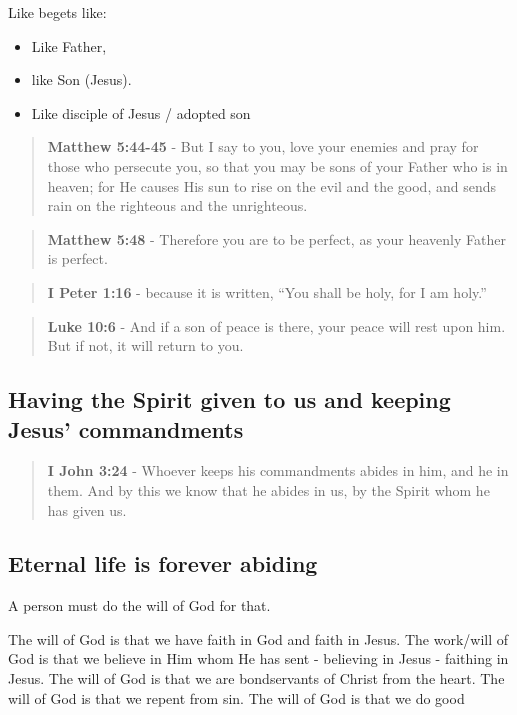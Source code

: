 \documentclass[11pt]{article}
\begin{document}
Like begets like:
\begin{itemize}
\item Like Father,
\item like Son (Jesus).
\item Like disciple of Jesus / adopted son
\end{itemize}

\begin{quote}
\textbf{Matthew 5:44-45} - But I say to you, love your enemies and pray for those who persecute you, so that you may be sons of your Father who is in heaven; for He causes His sun to rise on the evil and the good, and sends rain on the righteous and the unrighteous.
\end{quote}

\begin{quote}
\textbf{Matthew 5:48} - Therefore you are to be perfect, as your heavenly Father is perfect.
\end{quote}

\begin{quote}
\textbf{I Peter 1:16} - because it is written, “You shall be holy, for I am holy.”
\end{quote}

\begin{quote}
\textbf{Luke 10:6} - And if a son of peace is there, your peace will rest upon him. But if not, it will return to you.
\end{quote}

\subsection{Having the Spirit given to us and keeping Jesus' commandments}
\label{sec:orgbd97312}
\begin{quote}
\textbf{I John 3:24} - Whoever keeps his commandments abides in him, and he in them. And by this we know that he abides in us, by the Spirit whom he has given us.
\end{quote}

\subsection{Eternal life is forever abiding}
\label{sec:orgd8e87c0}
A person must do the will of God for that.

The will of God is that we have faith in God and faith in Jesus.
The work/will of God is that we believe in Him whom He has sent - believing in Jesus - faithing in Jesus.
The will of God is that we are bondservants of Christ from the heart.
The will of God is that we repent from sin.
The will of God is that we do good
\end{document}
